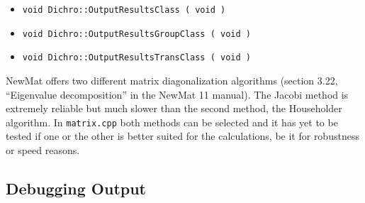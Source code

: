 \documentclass[11pt, letterpaper]{article}
\begin{document}
\begin{itemize}
\item \verb'void Dichro::OutputResultsClass ( void )'
\item \verb'void Dichro::OutputResultsGroupClass ( void )'
\item \verb'void Dichro::OutputResultsTransClass ( void )'
\end{itemize}

NewMat offers two different matrix diagonalization algorithms (section 3.22, ``Eigenvalue decomposition'' in the NewMat 11 manual). The Jacobi method is extremely reliable but much slower than the second method, the Householder algorithm. In \verb'matrix.cpp' both methods can be selected and it has yet to be tested if one or the other is better suited for the calculations, be it for robustness or speed reasons.





\subsection{Debugging Output}
\end{document}
